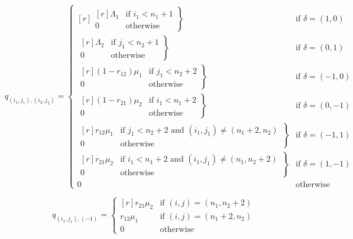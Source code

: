\documentclass{article}
\begin{document}
\begin{equation}
  q_{(i_1, j_1),(i_2, j_2)} = \left\{
  \begin{matrix*}[ r ]
    \left. \begin{matrix*}[ r ]
      \Lambda_1 & \text{if } i_1 < n_1 + 1 \\
      0 & \text{otherwise}
    \end{matrix*} \right\} & \text{if } \delta = (1, 0) \\
    \left. \begin{matrix*}[ r ]
      \Lambda_2 & \text{if } j_1 < n_2 + 1 \\
      0 & \text{otherwise}
    \end{matrix*} \right\} & \text{if } \delta = (0, 1) \\
    \left. \begin{matrix*}[ r ]
      (1 - r_{12})\mu_1 & \text{if } j_1 < n_2 + 2 \\
      0 & \text{otherwise}
    \end{matrix*} \right\} & \text{if } \delta = (-1, 0) \\
    \left. \begin{matrix*}[ r ]
      (1 - r_{21})\mu_2 & \text{if } i_1 < n_1 + 2 \\
      0 & \text{otherwise}
    \end{matrix*} \right\} & \text{if } \delta = (0, -1) \\
    \left. \begin{matrix*}[ r ]
      r_{12}\mu_1 & \text{if } j_1 < n_2 + 2 \text{ and } (i_1, j_1) \neq (n_1 + 2, n_2) \\
      0 & \text{otherwise}
    \end{matrix*} \right\} & \text{if } \delta = (-1, 1) \\
    \left. \begin{matrix*}[ r ]
      r_{21}\mu_2 & \text{if } i_1 < n_1 + 2 \text{ and } (i_1, j_1) \neq (n_1, n_2 + 2) \\
      0 & \text{otherwise}
    \end{matrix*} \right\} & \text{if } \delta = (1, -1) \\
    0 & \text{otherwise}
  \end{matrix*} \right.
\end{equation}

\begin{equation}
  q_{(i_1, j_1), (-1)} = \left\{
  \begin{matrix*}[ r ]
    r_{21}\mu_2 & \text{if } (i, j) = (n_1, n_2 + 2) \\
    r_{12}\mu_1 & \text{if } (i, j) = (n_1 + 2, n_2) \\
    0 & \text{otherwise}
  \end{matrix*}
  \right.
\end{equation}
\end{document}
